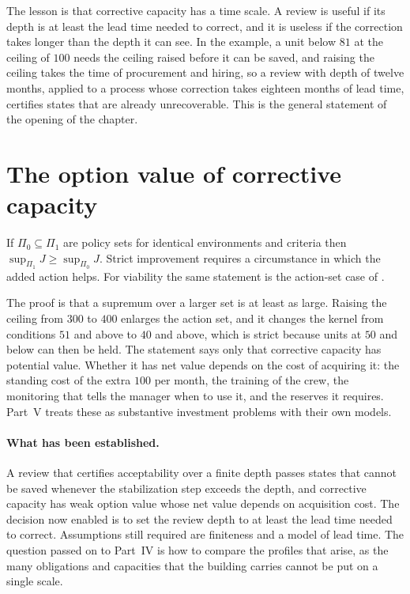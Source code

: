 The lesson is that corrective capacity has a time scale. A review is useful if its depth is at least the lead time needed to correct, and it is useless if the correction takes longer than the depth it can see. In the example, a unit below $81$ at the ceiling of $100$ needs the ceiling raised before it can be saved, and raising the ceiling takes the time of procurement and hiring, so a review with depth of twelve months, applied to a process whose correction takes eighteen months of lead time, certifies states that are already unrecoverable. This is the general statement of the opening of the chapter.

\section{The option value of corrective capacity}

\begin{proposition}\label{prop:P14}
If $\Pi_0\subseteq\Pi_1$ are policy sets for identical environments and criteria then $\sup_{\Pi_1}J\ge\sup_{\Pi_0}J$. Strict improvement requires a circumstance in which the added action helps. For viability the same statement is the action-set case of .
\end{proposition}

The proof is that a supremum over a larger set is at least as large. Raising the ceiling from $300$ to $400$ enlarges the action set, and it changes the kernel from conditions $51$ and above to $40$ and above, which is strict because units at $50$ and below can then be held. The statement says only that corrective capacity has potential value. Whether it has net value depends on the cost of acquiring it: the standing cost of the extra $100$ per month, the training of the crew, the monitoring that tells the manager when to use it, and the reserves it requires. Part~V treats these as substantive investment problems with their own models.

\paragraph{What has been established.} A review that certifies acceptability over a finite depth passes states that cannot be saved whenever the stabilization step exceeds the depth, and corrective capacity has weak option value whose net value depends on acquisition cost. The decision now enabled is to set the review depth to at least the lead time needed to correct. Assumptions still required are finiteness and a model of lead time. The question passed on to Part~IV is how to compare the profiles that arise, as the many obligations and capacities that the building carries cannot be put on a single scale.

